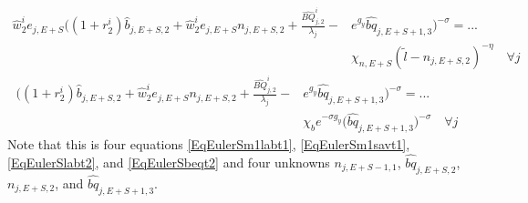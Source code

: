 \documentclass[letterpaper,12pt]{article}
\theoremstyle{definition}
\begin{document}
  \begin{equation}\label{EqEulerSlabt2}
    \begin{split}
      \hat{w}_2^i e_{j,E+S}\biggl(\left(1+r_2^i\right)\hat{b}_{j,E+S,2} + \hat{w}_2^i e_{j,E+S}n_{j,E+S,2} + \frac{\hat{BQ}_{j,2}^i}{\lambda_j} - &e^{g_y}\hat{bq}_{j,E+S+1,3}\biggr)^{-\sigma} = ... \\
      &\chi_{n,E+S}(\tilde{l} - n_{j,E+S,2})^{-\eta} \quad\forall j
    \end{split}
  \end{equation}
  \begin{equation}\label{EqEulerSbeqt2}
    \begin{split}
      \biggl(\left(1+r_2^i\right)\hat{b}_{j,E+S,2} + \hat{w}_2^i e_{j,E+S}n_{j,E+S,2} + \frac{\hat{BQ}_{j,2}^i}{\lambda_j} - &e^{g_y}\hat{bq}_{j,E+S+1,3}\biggr)^{-\sigma} = ... \\
      &\chi_b e^{-\sigma g_y}\bigl(\hat{bq}_{j,E+S+1,3}\bigr)^{-\sigma} \quad\forall j
    \end{split}
  \end{equation}
  Note that this is four equations \eqref{EqEulerSm1labt1}, \eqref{EqEulerSm1savt1}, \eqref{EqEulerSlabt2}, and \eqref{EqEulerSbeqt2} and four unknowns $n_{j,E+S-1,1}$, $\hat{bq}_{j,E+S,2}$, $n_{j,E+S,2}$, and $\hat{bq}_{j,E+S+1,3}$.
\end{document}
